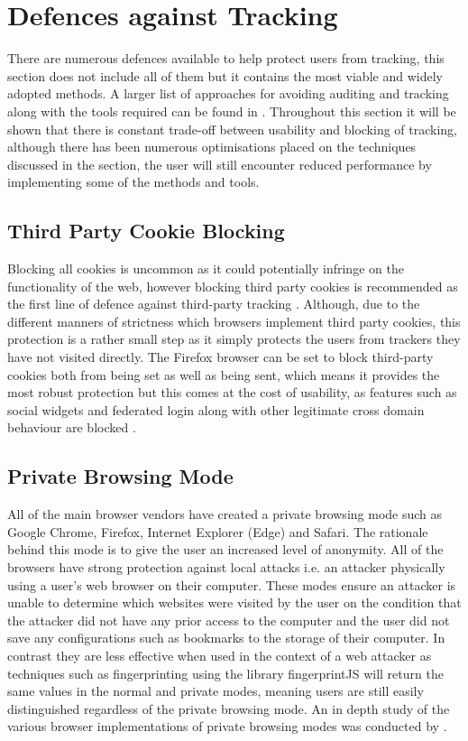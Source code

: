 \documentclass[12pt]{article}
\begin{document}
\pagebreak

\section{Defences against Tracking} \label{defences}
There are numerous defences available to help protect users from tracking, this section does not include all of them but it contains the most viable and widely adopted methods. A larger list of approaches for avoiding  auditing and tracking along with the tools required can be found in \parencite{bujlow2015web}. Throughout this section it will be shown that there is constant trade-off between usability and blocking of tracking, although there has been numerous optimisations placed on the techniques discussed in the section, the user will still encounter reduced performance by implementing some of the methods and tools.   

\subsection{Third Party Cookie Blocking}
Blocking all cookies is uncommon as it could potentially infringe on the functionality of the web, however blocking third party cookies is recommended as the first line of defence against third-party tracking \parencite{roesner}. Although, due to the different manners of strictness which browsers implement third party cookies, this protection is a rather small step as it simply protects the users from trackers they have not visited directly. The Firefox browser can be set to block third-party cookies both from being set as well as being sent, which means it provides the most robust protection but this comes at the cost of usability, as features such as social widgets and federated login along with other legitimate cross domain behaviour are blocked \parencite{roesner}.

\subsection{Private Browsing Mode}
All of the main browser vendors have created a private browsing mode such as Google Chrome, Firefox, Internet Explorer (Edge) and Safari. The rationale behind this mode is to give the user an increased level of anonymity. All of the browsers have strong protection against local attacks i.e. an attacker physically using a user's web browser on their computer. These modes ensure an attacker is unable to determine which websites were visited by the user on the condition that the attacker did not have any prior access to the computer and the user did not save any configurations such as bookmarks to the storage of their computer. In contrast they are less effective when used in the context of a web attacker as techniques such as fingerprinting using the library fingerprintJS will return the same values in the normal and private modes, meaning users are still easily distinguished regardless of the private browsing mode. An in depth study of the various browser implementations of private browsing modes was conducted by \parencite{bursztein2010analysis}.    
\end{document}
